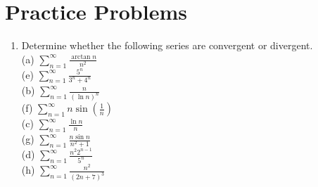 \documentclass[10pt]{article}
\begin{document}
\section*{Practice Problems}
\begin{enumerate}
  \item Determine whether the following series are convergent or divergent.\\
(a) $\sum_{n=1}^{\infty} \frac{\arctan n}{n^{2}}$\\
(e) $\sum_{n=1}^{\infty} \frac{5^{n}}{3^{n}+4^{n}}$\\
(b) $\sum_{n=1}^{\infty} \frac{n}{(\ln n)^{n}}$\\
(f) $\sum_{n=1}^{\infty} n \sin \left(\frac{1}{n}\right)$\\
(c) $\sum_{n=1}^{\infty} \frac{\ln n}{n}$\\
(g) $\sum_{n=1}^{\infty} \frac{n \sin n}{n^{2}+1}$\\
(d) $\sum_{n=1}^{\infty} \frac{n^{2} 2^{n-1}}{5^{n}}$\\
(h) $\sum_{n=1}^{\infty} \frac{n^{2}}{(2 n+7)^{3}}$
\end{enumerate}
\end{document}
